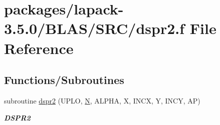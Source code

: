 \hypertarget{lapack-3_85_80_2BLAS_2SRC_2dspr2_8f}{}\section{packages/lapack-\/3.5.0/\+B\+L\+A\+S/\+S\+R\+C/dspr2.f File Reference}
\label{lapack-3_85_80_2BLAS_2SRC_2dspr2_8f}
\subsection*{Functions/\+Subroutines}
\begin{DoxyCompactItemize}
\item 
subroutine \hyperlink{group__double__blas__level2_ga16318e7e16083b395bd959b0cc93e803}{dspr2} (U\+P\+L\+O, \hyperlink{polmisc_8c_a0240ac851181b84ac374872dc5434ee4}{N}, A\+L\+P\+H\+A, X, I\+N\+C\+X, Y, I\+N\+C\+Y, A\+P)
\begin{DoxyCompactList}\small\item\em {\bfseries D\+S\+P\+R2} \end{DoxyCompactList}\end{DoxyCompactItemize}
